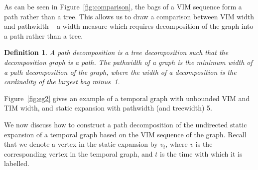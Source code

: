 \documentclass[a4paper,UKenglish,cleveref, autoref, thm-restate]{lipics-v2021} %
\newcounter{ctheorem}
\newtheorem{defn}[ctheorem]{Definition}
\begin{document}
As can be seen in Figure~\ref{fig:comparison}, the bags of a VIM sequence form a path rather than a tree. This allows us to draw a comparison between VIM width and pathwidth -- a width measure which requires decomposition of the graph into a path rather than a tree.

\begin{defn}\label{def:pw}
    A \emph{path decomposition} is a tree decomposition such that the decomposition graph is a path. The \emph{pathwidth} of a graph is the minimum width of a path decomposition of the graph, where the width of a decomposition is the cardinality of the largest bag minus~1.
\end{defn}
Figure~\ref{fig:eg2} gives an example of a temporal graph with unbounded VIM and TIM width, and static expansion with pathwidth (and treewidth) 5.
\begin{toappendix}
    We now discuss how to construct a path decomposition of the undirected static expansion of a temporal graph based on the VIM sequence of the graph. Recall that we denote a vertex in the static expansion by $v_t$, where $v$ is the corresponding vertex in the temporal graph, and $t$ is the time with which it is labelled. 
\end{toappendix}

\end{document}
